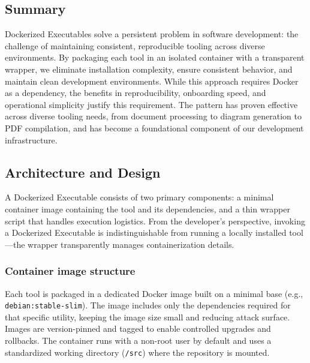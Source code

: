 \subsection{Summary}

Dockerized Executables solve a persistent problem in software
development: the challenge of maintaining consistent, reproducible
tooling across diverse environments. By packaging each tool in an isolated
container with a transparent wrapper, we eliminate installation
complexity, ensure consistent behavior, and maintain clean development
environments. While this approach requires Docker as a dependency, the
benefits in reproducibility, onboarding speed, and operational
simplicity justify this requirement. The pattern has proven effective across
diverse tooling needs, from document processing to diagram generation
to PDF compilation, and has become a foundational component of our development
infrastructure.

\subsection{Architecture and Design}

A Dockerized Executable consists of two primary components: a minimal
container image containing the tool and its dependencies, and a thin wrapper
script that handles execution logistics. From the developer's
perspective, invoking a Dockerized Executable is indistinguishable from
running a locally installed tool---the wrapper transparently manages containerization
details.

\subsubsection{Container image structure}

Each tool is packaged in a dedicated Docker image built on a minimal
base (e.g., \texttt{debian:stable-slim}). The image includes only the
dependencies required for that specific utility, keeping the image size
small and reducing attack surface. Images are version-pinned and
tagged to enable controlled upgrades and rollbacks. The container runs
with a non-root user by default and uses a standardized working directory
(\texttt{/src}) where the repository is mounted.

